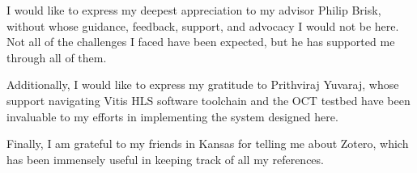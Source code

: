 I would like to express my deepest appreciation to my advisor Philip Brisk,
without whose guidance, feedback, support, and advocacy I would not be here. Not
all of the challenges I faced have been expected, but he has supported me
through all of them.

Additionally, I would like to express my gratitude to Prithviraj Yuvaraj, whose
support navigating Vitis HLS software toolchain and the OCT testbed have been
invaluable to my efforts in implementing the system designed here.

Finally, I am grateful to my friends in Kansas for telling me about Zotero,
which has been immensely useful in keeping track of all my references.
